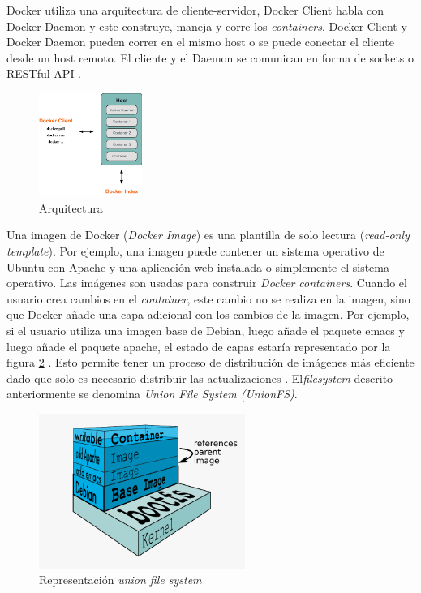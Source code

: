 	Docker utiliza una arquitectura de cliente-servidor, Docker Client habla con Docker Daemon y este construye, maneja y corre los \textit{containers}. Docker Client y Docker Daemon pueden correr en el mismo host o se puede conectar el cliente desde un host remoto. El cliente y el Daemon se comunican en forma de sockets o RESTful API \cite{Docker:2015:understanding}.
	
\begin{figure}[]
  \centering
    \includegraphics[width=0.3\textwidth]{Figures/architecture.png}
    \caption{Arquitectura}
    \label{fig:arquitectura}
\end{figure}	
	

	Una imagen de Docker (\textit{Docker Image}) es una plantilla de solo lectura (\textit{read-only template}). Por ejemplo, una imagen puede contener un sistema operativo de Ubuntu con Apache y una aplicación web instalada o simplemente el sistema operativo. Las imágenes son usadas para construir \emph{Docker containers}. Cuando el usuario crea cambios en el \textit{container}, este cambio no se realiza en la imagen, sino  que Docker añade una capa adicional con los cambios de la imagen\cite{bui2015analysis}. Por ejemplo, si el usuario utiliza una imagen base de Debian, luego añade el paquete emacs y luego añade el paquete apache, el estado de capas estaría representado por la figura \ref{fig:arquitectura} \cite{Docker:2015:Online}. Esto permite tener un proceso de distribución de imágenes más eficiente dado que solo es necesario distribuir las actualizaciones \cite{bui2015analysis}. El\textit{filesystem} descrito anteriormente se denomina \textit{Union File System (UnionFS)}.
\begin{figure}[]
  \centering
  \includegraphics[width=0.6\textwidth]{Figures/docker-filesystems-multilayer}
    \caption{Representación \textit{union file system}}
    \label{fig:arquitectura}

    

\end{figure}	

